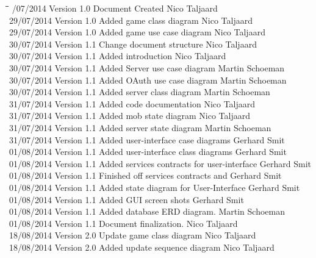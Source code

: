 \documentclass[letterpaper]{article}
\begin{document}
		\begin{tabbing}
			\hspace*{2.5cm}\=\hspace*{2.5cm}\=\hspace*{8cm}\=\hspace*{3cm} /07/2014	\> Version 1.0	\> Document Created 							\> Nico Taljaard \\
			29/07/2014	\> Version 1.0	\> Added game class diagram						\> Nico Taljaard \\
			29/07/2014	\> Version 1.0	\> Added game use case diagram					\> Nico Taljaard \\
			30/07/2014	\> Version 1.1	\> Change document structure					\> Nico Taljaard \\
			30/07/2014	\> Version 1.1	\> Added introduction							\> Nico Taljaard \\
			30/07/2014  \> Version 1.1  \> Added Server use case diagram				\> Martin Schoeman\\
			30/07/2014  \> Version 1.1  \> Added OAuth use case diagram					\> Martin Schoeman\\
			30/07/2014  \> Version 1.1  \> Added server class diagram					\> Martin Schoeman\\
			31/07/2014  \> Version 1.1  \> Added code documentation						\> Nico Taljaard\\
			31/07/2014  \> Version 1.1  \> Added mob state diagram						\> Nico Taljaard\\
			31/07/2014  \> Version 1.1  \> Added server state diagram					\> Martin Schoeman\\
			31/07/2014  \> Version 1.1  \> Added user-interface case diagrams			\> Gerhard Smit\\
			01/08/2014  \> Version 1.1  \> Added user-interface class diagrams			\> Gerhard Smit\\
			01/08/2014  \> Version 1.1  \> Added services contracts for user-interface 	\> Gerhard Smit\\
			01/08/2014  \> Version 1.1  \> Finished off services contracts and 			\> Gerhard Smit\\
			01/08/2014	\> Version 1.1	\> Added state diagram for User-Interface 		\> Gerhard Smit\\
			01/08/2014  \> Version 1.1  \> Added GUI screen shots						\> Gerhard Smit\\
			01/08/2014  \> Version 1.1  \> Added database ERD diagram.					\> Martin Schoeman\\
			01/08/2014  \> Version 1.1  \> Document finalization.						\> Nico Taljaard\\
			18/08/2014  \> Version 2.0  \> Update game class diagram					\> Nico Taljaard\\
			18/08/2014  \> Version 2.0  \> Added update sequence diagram				\> Nico Taljaard\\
		\end{tabbing}
		
\end{document}
